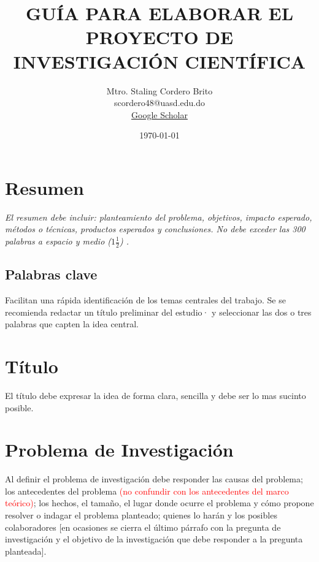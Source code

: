 \documentclass[12pt,a4paper]{article}
\title{\textbf{GUÍA PARA ELABORAR EL PROYECTO DE INVESTIGACIÓN CIENTÍFICA}}
\author{Mtro. Staling Cordero Brito \\ scordero48@uasd.edu.do \\ \href{https://scholar.google.com/citations?user=qJyINo0AAAAJ}{Google Scholar}}
\date{\today}
\begin{document}
\maketitle
\thispagestyle{empty}

\tableofcontents
\newpage

\section*{Resumen}

\noindent
\textit{El resumen debe incluir: planteamiento del problema, objetivos, impacto esperado, métodos o técnicas, productos esperados y conclusiones. No debe exceder las 300 palabras a espacio y medio (\(1\frac{1}{2}\))
.}

\subsection*{Palabras clave}
\noindent
Facilitan una rápida identificación de los temas centrales del trabajo. Se se recomienda redactar un título preliminar del
estudio· y seleccionar las dos o
tres palabras que capten la idea
central.

\section{Título}
 \noindent
El título debe expresar la idea de forma clara, sencilla y debe ser lo mas sucinto posible.

\section{Problema de Investigación}
\noindent
Al definir el problema de investigación debe responder las causas del problema; los
antecedentes del problema \textcolor{red}{(no confundir con los antecedentes del marco teórico)}; los hechos, el tamaño, el lugar donde ocurre el problema y cómo
propone resolver o indagar el problema planteado; quienes lo harán y los posibles
colaboradores [en ocasiones se cierra el último párrafo con la pregunta de
investigación y el objetivo de la investigación que debe responder a la pregunta
planteada].
\end{document}
